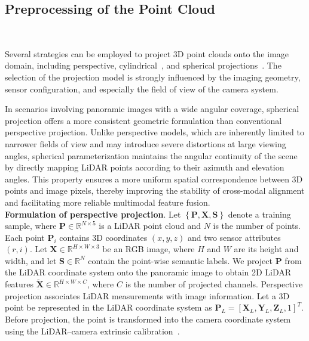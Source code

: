 \subsection{Preprocessing of the Point Cloud}~\label{subsec:lidar-preprocessing}

Several strategies can be employed to project 3D point clouds onto the image domain, including perspective, cylindrical~\cite{Kang2019RobustCP}, and spherical projections~\cite{HeYingshen2020}. The selection of the projection model is strongly influenced by the imaging geometry, sensor configuration, and especially the field of view of the camera system. 

In scenarios involving panoramic images with a wide angular coverage, spherical projection offers a more consistent geometric formulation than conventional perspective projection. Unlike perspective models, which are inherently limited to narrower fields of view and may introduce severe distortions at large viewing angles, spherical parameterization maintains the angular continuity of the scene by directly mapping LiDAR points according to their azimuth and elevation angles. This property ensures a more uniform spatial correspondence between 3D points and image pixels, thereby improving the stability of cross-modal alignment and facilitating more reliable multimodal feature fusion. \\

\textbf{Formulation of perspective projection}. Let $\left\{\mathbf{P}, \mathbf{X}, \mathbf{S} \right\}$ denote a training sample, where $\mathbf{P} \in \mathbb{R}^{N \times 5}$ is a LiDAR point cloud and $N$ is the number of points. Each point $\mathbf{P}_i$ contains 3D coordinates $(x,y,z)$ and two sensor attributes $(r,i)$. Let $\mathbf{X} \in \mathbb{R}^{H \times W \times 3}$ be an RGB image, where $H$ and $W$ are its height and width, and let $\mathbf{S} \in \mathbb{R}^N$ contain the point-wise semantic labels. We project $\mathbf{P}$ from the LiDAR coordinate system onto the panoramic image to obtain 2D LiDAR features $\mathbf{\tilde{X}} \in \mathbb{R}^{H \times W \times C}$, where $C$ is the number of projected channels.
Perspective projection associates LiDAR measurements with image information. Let a 3D point be represented in the LiDAR coordinate system as $\mathbf{P}_L = [\mathbf{X}_L, \mathbf{Y}_L, \mathbf{Z}_L, 1]^T$. Before projection, the point is transformed into the camera coordinate system using the LiDAR--camera extrinsic calibration~\cite{verma2019automaticextrinsiccalibrationcamera, Cai-Yujian2021, Gerardo2011, Geiger2012AutomaticCA, Jing2022, Zang2022}.

